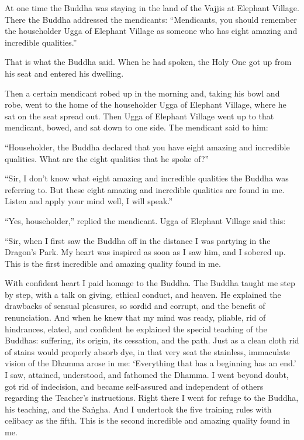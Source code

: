 \documentclass[12pt,openany]{book}%
\begin{document}
At one time the Buddha was staying in the land of the Vajjis at Elephant Village. There the Buddha addressed the mendicants: “Mendicants, you should remember the householder Ugga of Elephant Village as someone who has eight amazing and incredible qualities.” 

That is what the Buddha said. When he had spoken, the Holy One got up from his seat and entered his dwelling. 

Then a certain mendicant robed up in the morning and, taking his bowl and robe, went to the home of the householder Ugga of Elephant Village, where he sat on the seat spread out. Then Ugga of Elephant Village went up to that mendicant, bowed, and sat down to one side. The mendicant said to him: 

“Householder, the Buddha declared that you have eight amazing and incredible qualities. What are the eight qualities that he spoke of?” 

“Sir, I don’t know what eight amazing and incredible qualities the Buddha was referring to. But these eight amazing and incredible qualities are found in me. Listen and apply your mind well, I will speak.” 

“Yes, householder,” replied the mendicant. Ugga of Elephant Village said this: 

“Sir, when I first saw the Buddha off in the distance I was partying in the Dragon’s Park. My heart was inspired as soon as I saw him, and I sobered up. This is the first incredible and amazing quality found in me. 

With confident heart I paid homage to the Buddha. The Buddha taught me step by step, with a talk on giving, ethical conduct, and heaven. He explained the drawbacks of sensual pleasures, so sordid and corrupt, and the benefit of renunciation. And when he knew that my mind was ready, pliable, rid of hindrances, elated, and confident he explained the special teaching of the Buddhas: suffering, its origin, its cessation, and the path. Just as a clean cloth rid of stains would properly absorb dye, in that very seat the stainless, immaculate vision of the Dhamma arose in me: ‘Everything that has a beginning has an end.’ I saw, attained, understood, and fathomed the Dhamma. I went beyond doubt, got rid of indecision, and became self-assured and independent of others regarding the Teacher’s instructions. Right there I went for refuge to the Buddha, his teaching, and the \textsanskrit{Saṅgha}. And I undertook the five training rules with celibacy as the fifth. This is the second incredible and amazing quality found in me. 
\end{document}
